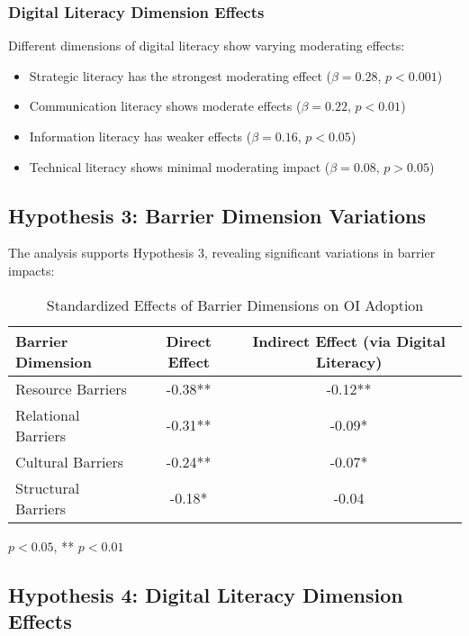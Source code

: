 \subsubsection{Digital Literacy Dimension Effects}
Different dimensions of digital literacy show varying moderating effects:
\begin{itemize}
    \item Strategic literacy has the strongest moderating effect ($\beta = 0.28$, $p < 0.001$)
    \item Communication literacy shows moderate effects ($\beta = 0.22$, $p < 0.01$)
    \item Information literacy has weaker effects ($\beta = 0.16$, $p < 0.05$)
    \item Technical literacy shows minimal moderating impact ($\beta = 0.08$, $p > 0.05$)
\end{itemize}

\subsection{Hypothesis 3: Barrier Dimension Variations}

The analysis supports Hypothesis 3, revealing significant variations in barrier impacts:

\begin{table}[H]
\centering
\caption{Standardized Effects of Barrier Dimensions on OI Adoption}
\label{tab:barrier_effects}
\begin{tabular}{@{}lcc@{}}
\toprule
\textbf{Barrier Dimension} & \textbf{Direct Effect} & \textbf{Indirect Effect (via Digital Literacy)} \\
\midrule
Resource Barriers & -0.38** & -0.12** \\
Relational Barriers & -0.31** & -0.09* \\
Cultural Barriers & -0.24** & -0.07* \\
Structural Barriers & -0.18* & -0.04 \\
\bottomrule
\end{tabular}
\begin{tablenotes}
\item * $p < 0.05$, ** $p < 0.01$
\end{tablenotes}
\end{table}

\subsection{Hypothesis 4: Digital Literacy Dimension Effects}

